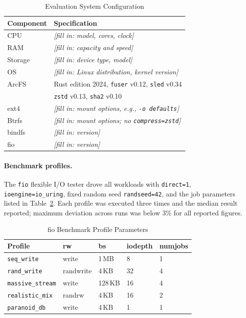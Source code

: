 \documentclass[journal]{IEEEtran}
\begin{document}
\begin{table}[t]
\caption{Evaluation System Configuration}
\label{tab:sysconfig}
\centering
\renewcommand{\arraystretch}{1.2}
\begin{tabular}{ll}
\toprule
\textbf{Component} & \textbf{Specification} \\
\midrule
CPU           & \textit{[fill in: model, cores, clock]} \\
RAM           & \textit{[fill in: capacity and speed]} \\
Storage       & \textit{[fill in: device type, model]} \\
OS            & \textit{[fill in: Linux distribution, kernel version]} \\
\midrule
ArcFS         & Rust edition 2024, \texttt{fuser} v0.12, \texttt{sled} v0.34 \\
              & \texttt{zstd} v0.13, \texttt{sha2} v0.10 \\
ext4          & \textit{[fill in: mount options, e.g., \texttt{-o defaults}]} \\
Btrfs         & \textit{[fill in: mount options; no \texttt{compress=zstd}]} \\
bindfs        & \textit{[fill in: version]} \\
fio           & \textit{[fill in: version]} \\
\bottomrule
\end{tabular}
\end{table}

\paragraph{Benchmark profiles.}
The \texttt{fio} flexible I/O tester drove all workloads with
\texttt{direct=1}, \texttt{ioengine=io\_uring}, fixed random seed
\texttt{randseed=42}, and the job parameters listed in
Table~\ref{tab:fio}.  Each profile was executed three times and the
median result reported; maximum deviation across runs was below 3\%
for all reported figures.

\begin{table}[t]
\caption{fio Benchmark Profile Parameters}
\label{tab:fio}
\centering
\renewcommand{\arraystretch}{1.2}
\begin{tabular}{lllll}
\toprule
\textbf{Profile} & \textbf{rw} & \textbf{bs} & \textbf{iodepth} & \textbf{numjobs} \\
\midrule
\texttt{seq\_write}     & write      & 1\,MB & 8  & 1 \\
\texttt{rand\_write}    & randwrite  & 4\,KB & 32 & 4 \\
\texttt{massive\_stream}& write      & 128\,KB & 16 & 4 \\
\texttt{realistic\_mix} & randrw     & 4\,KB & 16 & 2 \\
\texttt{paranoid\_db}   & write      & 4\,KB & 1  & 1 \\
\bottomrule
\end{tabular}
\end{table}
\end{document}
